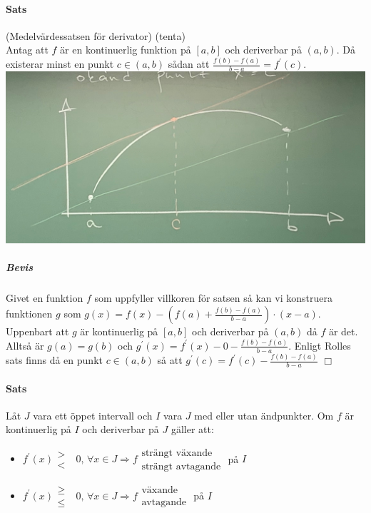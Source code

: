 \paragraph{Sats} (Medelvärdessatsen för derivator) (tenta)\\
Antag att $f$ är en kontinuerlig funktion på $[a,b]$ och deriverbar på $(a,b)$.
Då existerar minst en punkt $c\in(a,b)$ sådan att $\frac{f(b)-f(a)}{b-a}=f^\prime(c)$.\\
\includegraphics[scale=0.1]{lessons/lesson07/imgs/img03.jpg}\\
\subparagraph{Bevis}
Givet en funktion $f$ som uppfyller villkoren för satsen så kan vi konstruera funktionen $g$ som $g(x)=f(x)-(f(a)+\frac{f(b)-f(a)}{b-a})\cdot (x-a)$.
Uppenbart att $g$ är kontinuerlig på $[a,b]$ och deriverbar på $(a,b)$ då $f$ är det.
Alltså är $g(a)=g(b)$ och $g^\prime(x)=f^\prime(x)-0-\frac{f(b)-f(a)}{b-a}$.
Enligt Rolles sats finns då en punkt $c\in(a,b)$ så att $g^\prime(c)=f^\prime(c)-\frac{f(b)-f(a)}{b-a}$ $\Box$

\paragraph{Sats}
Låt $J$ vara ett öppet intervall och $I$ vara $J$ med eller utan ändpunkter.
Om $f$ är kontinuerlig på $I$ och deriverbar på $J$ gäller att:
\begin{itemize}
    \item $f^\prime(x)\begin{matrix}
                  > \\
                  <
              \end{matrix}\text{ }0\text{, }\forall x\in J \Rightarrow f \begin{matrix}
                  \text{strängt växande} \\
                  \text{strängt avtagande}
              \end{matrix}$ på $I$
    \item $f^\prime(x)\begin{matrix}
                  \geq \\
                  \leq
              \end{matrix}\text{ }0\text{, }\forall x\in J \Rightarrow f \begin{matrix}
                  \text{växande} \\
                  \text{avtagande}
              \end{matrix}$ på $I$
\end{itemize}